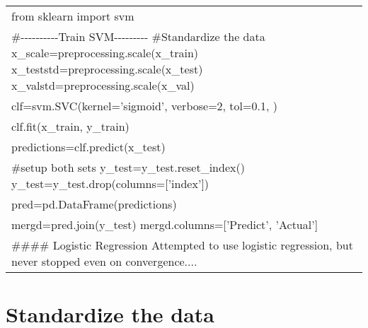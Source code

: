 \documentclass[11pt]{article}
\begin{document}
\begin{longtable}[]{@{}l@{}}
\toprule
\begin{minipage}[t]{0.77\columnwidth}\raggedright\strut
from sklearn import svm\strut
\end{minipage}\tabularnewline
\begin{minipage}[t]{0.77\columnwidth}\raggedright\strut
\#-\/-\/-\/-\/-\/-\/-\/-\/-\/-Train SVM-\/-\/-\/-\/-\/-\/-\/-\/-
\#Standardize the data x\_scale=preprocessing.scale(x\_train)
x\_teststd=preprocessing.scale(x\_test)
x\_valstd=preprocessing.scale(x\_val)\strut
\end{minipage}\tabularnewline
\begin{minipage}[t]{0.77\columnwidth}\raggedright\strut
clf=svm.SVC(kernel='sigmoid', verbose=2, tol=0.1, )\strut
\end{minipage}\tabularnewline
\begin{minipage}[t]{0.77\columnwidth}\raggedright\strut
clf.fit(x\_train, y\_train)\strut
\end{minipage}\tabularnewline
\begin{minipage}[t]{0.77\columnwidth}\raggedright\strut
predictions=clf.predict(x\_test)\strut
\end{minipage}\tabularnewline
\begin{minipage}[t]{0.77\columnwidth}\raggedright\strut
\#setup both sets y\_test=y\_test.reset\_index()
y\_test=y\_test.drop(columns={[}'index'{]})\strut
\end{minipage}\tabularnewline
\begin{minipage}[t]{0.77\columnwidth}\raggedright\strut
pred=pd.DataFrame(predictions)\strut
\end{minipage}\tabularnewline
\begin{minipage}[t]{0.77\columnwidth}\raggedright\strut
mergd=pred.join(y\_test) mergd.columns={[}'Predict', 'Actual'{]}\strut
\end{minipage}\tabularnewline
\begin{minipage}[t]{0.77\columnwidth}\raggedright\strut
\#\#\#\# Logistic Regression Attempted to use logistic regression, but
never stopped even on convergence....\strut
\end{minipage}\tabularnewline
\bottomrule
\end{longtable}

\section{Standardize the data}\label{standardize-the-data}
\end{document}

